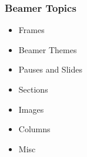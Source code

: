 \documentclass[main.tex]{subfiles}
\begin{document}
  \begin{frame}
    \frametitle{Beamer Topics}

    \begin{itemize}
      \item{Frames}\pause
      \item{Beamer Themes}\pause
      \item{Pauses and Slides}%
      \item{Sections}%
      \item{Images}%
      \item{Columns}%
      \item{Misc}
    \end{itemize}

  \end{frame}

  
\end{document}
